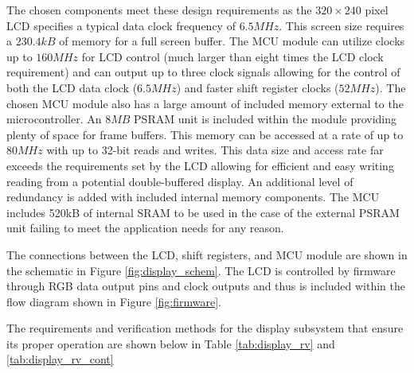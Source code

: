 \documentclass[12pt]{article}
\begin{document}
The chosen components meet these design requirements as the $320\times240$ pixel LCD specifies a typical data clock frequency of $6.5MHz$. This screen size requires a $230.4kB$ of memory for a full screen buffer. The MCU module can utilize clocks up to $160MHz$ for LCD control (much larger than eight times the LCD clock requirement) and can output up to three clock signals allowing for the control of both the LCD data clock ($6.5MHz$) and faster shift register clocks ($52MHz$). The chosen MCU module also has a large amount of included memory external to the microcontroller. An $8MB$ PSRAM unit is included within the module providing plenty of space for frame buffers. This memory can be accessed at a rate of up to $80MHz$ with up to 32-bit reads and writes. This data size and access rate far exceeds the requirements set by the LCD allowing for efficient and easy writing reading from a potential double-buffered display. An additional level of redundancy is added with included internal memory components. The MCU includes 520kB of internal SRAM to be used in the case of the external PSRAM unit failing to meet the application needs for any reason.

The connections between the LCD, shift registers, and MCU module are shown in the schematic in Figure \ref{fig:display_schem}. The LCD is controlled by firmware through RGB data output pins and clock outputs and thus is included within the flow diagram shown in Figure \ref{fig:firmware}.

The requirements and verification methods for the display subsystem that ensure its proper operation are shown below in Table \ref{tab:display_rv} and \ref{tab:display_rv_cont}
\end{document}
